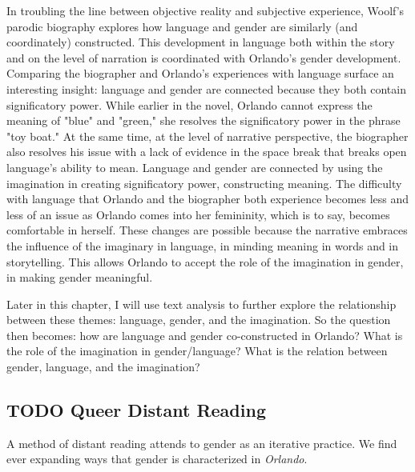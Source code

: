 \documentclass[11pt]{article}
\begin{document}
In troubling the line between objective reality and subjective
experience, Woolf’s parodic biography explores how language and gender
are similarly (and coordinately) constructed. This development in
language both within the story and on the level of narration is
coordinated with Orlando's gender development. Comparing the
biographer and Orlando's experiences with language surface an
interesting insight: language and gender are connected because they
both contain significatory power. While earlier in the novel, Orlando
cannot express the meaning of "blue" and "green," she resolves the
significatory power in the phrase "toy boat." At the same time, at the
level of narrative perspective, the biographer also resolves his issue
with a lack of evidence in the space break that breaks open language's
ability to mean. Language and gender are connected by using the
imagination in creating significatory power, constructing meaning. The
difficulty with language that Orlando and the biographer both
experience becomes less and less of an issue as Orlando comes into her
femininity, which is to say, becomes comfortable in herself. These
changes are possible because the narrative embraces the influence of
the imaginary in language, in minding meaning in words and in
storytelling. This allows Orlando to accept the role of the
imagination in gender, in making gender meaningful.

Later in this chapter, I will use text analysis to further explore the
relationship between these themes: language, gender, and the
imagination. So the question then becomes: how are language and gender
co-constructed in Orlando?  What is the role of the imagination in
gender/language? What is the relation between gender, language, and
the imagination?


\subsection{{\bfseries\sffamily TODO} Queer Distant Reading}
\label{sec:orgf05d4d4}
A method of distant reading attends to gender as an iterative
practice. We find ever expanding ways that gender is characterized in
\emph{Orlando}.
\end{document}
